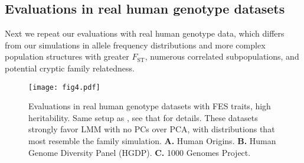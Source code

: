 \documentclass[9pt,lineno]{elife}
\newcommand{\Fst}{F_{\text{ST}}}
\begin{document}
\subsection{Evaluations in real human genotype datasets}

Next we repeat our evaluations with real human genotype data, which differs from our simulations in allele frequency distributions and more complex population structures with greater $\Fst$, numerous correlated subpopulations, and potential cryptic family relatedness.

\begin{figure}
  \begin{fullwidth}
    \texttt{[image: fig4.pdf]}
    \caption{
      Evaluations in real human genotype datasets with FES traits, high heritability.
      Same setup as , see that for details.
      These datasets strongly favor LMM with no PCs over PCA, with distributions that most resemble the family simulation.
      \textbf{A.}
      Human Origins.
      \textbf{B.}
      Human Genome Diversity Panel (HGDP).
      \textbf{C.}
      1000 Genomes Project.
    }
    \label{fig:rmsd-auc-real}
    \label{figsupp:rmsd-auc-real-rc}
    \label{figsupp:rmsd-auc-real-fes-h3}
    \label{figsupp:rmsd-auc-real-rc-h3}
    \label{figsupp:rmsd-auc-real-fes-env}
    \label{figsupp:rmsd-auc-real-rc-env}
\end{fullwidth}
\end{figure}
\end{document}
